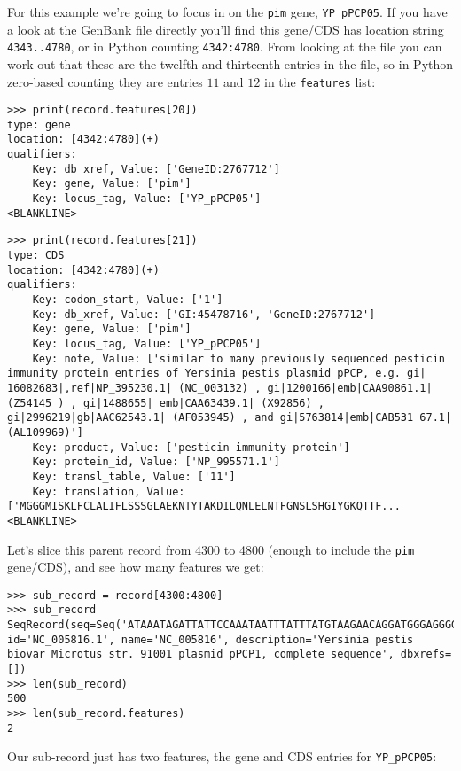 For this example we're going to focus in on the \verb|pim| gene, \verb|YP_pPCP05|.
If you have a look at the GenBank file directly you'll find this gene/CDS has
location string \texttt{4343..4780}, or in Python counting \texttt{4342:4780}.
From looking at the file you can work out that these are the twelfth and
thirteenth entries in the file, so in Python zero-based counting they are
entries $11$ and $12$ in the \texttt{features} list:

\begin{verbatim}
>>> print(record.features[20])
type: gene
location: [4342:4780](+)
qualifiers:
    Key: db_xref, Value: ['GeneID:2767712']
    Key: gene, Value: ['pim']
    Key: locus_tag, Value: ['YP_pPCP05']
<BLANKLINE>
\end{verbatim}

\begin{verbatim}
>>> print(record.features[21])
type: CDS
location: [4342:4780](+)
qualifiers:
    Key: codon_start, Value: ['1']
    Key: db_xref, Value: ['GI:45478716', 'GeneID:2767712']
    Key: gene, Value: ['pim']
    Key: locus_tag, Value: ['YP_pPCP05']
    Key: note, Value: ['similar to many previously sequenced pesticin immunity protein entries of Yersinia pestis plasmid pPCP, e.g. gi| 16082683|,ref|NP_395230.1| (NC_003132) , gi|1200166|emb|CAA90861.1| (Z54145 ) , gi|1488655| emb|CAA63439.1| (X92856) , gi|2996219|gb|AAC62543.1| (AF053945) , and gi|5763814|emb|CAB531 67.1| (AL109969)']
    Key: product, Value: ['pesticin immunity protein']
    Key: protein_id, Value: ['NP_995571.1']
    Key: transl_table, Value: ['11']
    Key: translation, Value: ['MGGGMISKLFCLALIFLSSSGLAEKNTYTAKDILQNLELNTFGNSLSHGIYGKQTTF...
<BLANKLINE>
\end{verbatim}

Let's slice this parent record from 4300 to 4800 (enough to include the \verb|pim|
gene/CDS), and see how many features we get:

\begin{verbatim}
>>> sub_record = record[4300:4800]
>>> sub_record
SeqRecord(seq=Seq('ATAAATAGATTATTCCAAATAATTTATTTATGTAAGAACAGGATGGGAGGGGGA...TTA'), id='NC_005816.1', name='NC_005816', description='Yersinia pestis biovar Microtus str. 91001 plasmid pPCP1, complete sequence', dbxrefs=[])
>>> len(sub_record)
500
>>> len(sub_record.features)
2
\end{verbatim}

Our sub-record just has two features, the gene and CDS entries for \verb|YP_pPCP05|:

